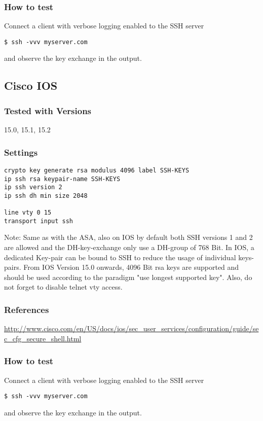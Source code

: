 \subsubsection{How to test}
Connect a client with verbose logging enabled to the SSH server
\begin{lstlisting}
$ ssh -vvv myserver.com
\end{lstlisting}and observe the key exchange in the output.


\subsection{Cisco IOS}
\subsubsection{Tested with Versions}
\begin{itemize*}
  \item 15.0, 15.1, 15.2
\end{itemize*}


\subsubsection{Settings}
\begin{lstlisting}
crypto key generate rsa modulus 4096 label SSH-KEYS
ip ssh rsa keypair-name SSH-KEYS
ip ssh version 2
ip ssh dh min size 2048

line vty 0 15
transport input ssh
\end{lstlisting}
Note: Same as with the ASA, also on IOS by default both SSH versions 1 and 2 are allowed and the DH-key-exchange only use a DH-group of 768 Bit.
In IOS, a dedicated Key-pair can be bound to SSH to reduce the usage of individual keys-pairs.
From IOS Version 15.0 onwards, 4096 Bit rsa keys are supported and should be used according to the paradigm "use longest supported key". Also, do not forget to disable telnet vty access.


\subsubsection{References}
\begin{itemize*}
  \item \url{http://www.cisco.com/en/US/docs/ios/sec\_user\_services/configuration/guide/sec\_cfg\_secure\_shell.html}
\end{itemize*}

\subsubsection{How to test}
Connect a client with verbose logging enabled to the SSH server
\begin{lstlisting}
$ ssh -vvv myserver.com
\end{lstlisting}and observe the key exchange in the output.
